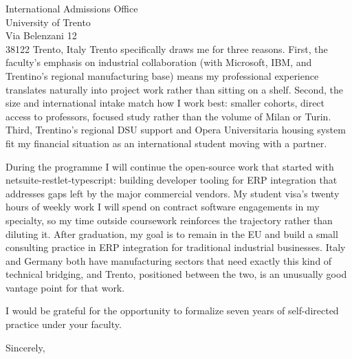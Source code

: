 \begin{letter}{
  International Admissions Office\\
  University of Trento\\
  Via Belenzani 12\\
  38122 Trento, Italy
}
Trento specifically draws me for three reasons. First, the faculty's emphasis on industrial collaboration (with Microsoft, IBM, and Trentino's regional manufacturing base) means my professional experience translates naturally into project work rather than sitting on a shelf. Second, the size and international intake match how I work best: smaller cohorts, direct access to professors, focused study rather than the volume of Milan or Turin. Third, Trentino's regional DSU support and Opera Universitaria housing system fit my financial situation as an international student moving with a partner.

During the programme I will continue the open-source work that started with netsuite-restlet-typescript: building developer tooling for ERP integration that addresses gaps left by the major commercial vendors. My student visa's twenty hours of weekly work I will spend on contract software engagements in my specialty, so my time outside coursework reinforces the trajectory rather than diluting it. After graduation, my goal is to remain in the EU and build a small consulting practice in ERP integration for traditional industrial businesses. Italy and Germany both have manufacturing sectors that need exactly this kind of technical bridging, and Trento, positioned between the two, is an unusually good vantage point for that work.

I would be grateful for the opportunity to formalize seven years of self-directed practice under your faculty.

\closing{Sincerely,}

\end{letter}


